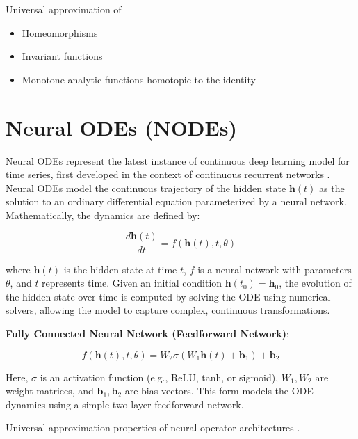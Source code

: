 \documentclass{article}
\theoremstyle{definition}
\theoremstyle{remark}
\newcounter{ct}
\begin{document}
Universal approximation of 
\begin{itemize}
\item Homeomorphisms \citep{zhang2020approximation}
\item Invariant functions\citep{li2022deep}
\item Monotone analytic functions homotopic to the identity\citep{tabuada2020universal}
\end{itemize}

\citep{tabuada2022universal}
\citep{marchi2021training}


\section{Neural ODEs (NODEs)}
Neural ODEs \citep{chen2018neural} represent the latest instance of continuous deep learning model for time series, first developed in the context of continuous recurrent networks \citep{cohen1983absolute}.
%
Neural ODEs model the continuous trajectory of the hidden state \( \mathbf{h}(t) \) as the solution to an ordinary differential equation parameterized by a neural network. Mathematically, the dynamics are defined by:

\[
\frac{d \mathbf{h}(t)}{dt} = f(\mathbf{h}(t), t, \theta)
\]

where \( \mathbf{h}(t) \) is the hidden state at time \( t \), \( f \) is a neural network with parameters \( \theta \), and \( t \) represents time. Given an initial condition \( \mathbf{h}(t_0) = \mathbf{h}_0 \), the evolution of the hidden state over time is computed by solving the ODE using numerical solvers, allowing the model to capture complex, continuous transformations.

\textbf{Fully Connected Neural Network (Feedforward Network)}:

\[
f(\mathbf{h}(t), t, \theta) = W_2 \sigma(W_1 \mathbf{h}(t) + \mathbf{b}_1) + \mathbf{b}_2
\]

Here, \( \sigma \) is an activation function (e.g., ReLU, tanh, or sigmoid), \( W_1, W_2 \) are weight matrices, and \( \mathbf{b}_1, \mathbf{b}_2 \) are bias vectors.
 This form models the ODE dynamics using a simple two-layer feedforward network.


Universal approximation properties of neural operator architectures \citep{lu2021learning, kissas2022learning, kovachki2021universal}.
\end{document}
